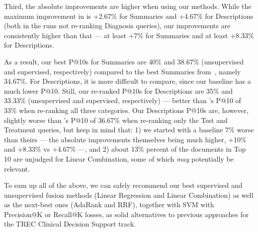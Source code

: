 Third, the absolute improvements are higher when using our methods.
While the maximum improvement
in \cite{choi} is +2.67\% for Summaries and +4.67\% for Descriptions (both in the runs not re-ranking Diagnosis queries),
our improvements are consistently
higher than that --- at least +7\% for Summaries and at least +8.33\% for Descriptions.

As a result, our best P@10s for Summaries are 40\% and 38.67\%
(unsupervised and supervised, respectively) compared to the best Summaries from~\cite{choi}, namely 34.67\%.
For Descriptions, it is more difficult to compare, since our baseline has a much lower P@10.
Still, our re-ranked P@10s for Descriptions are 35\% and 33.33\% (unsupervised and supervised, respectively)
 --- better than \cite{choi}'s P@10 of 33\% when re-ranking all three categories.
Our Descriptions P@10s are, however, slightly worse
than \cite{choi}'s P@10 of 36.67\% when re-ranking only the Test and Treatment queries, but keep in mind that:
1) we started with a baseline 7\% worse than theirs --- the absolute improvements themselves being much higher, +10\% and +8.33\%
vs +4.67\% ---, and 2) about 13\% percent of the documents in Top 10 are unjudged for Linear Combination,
some of which \emph{may} potentially be relevant.

To sum up all of the above, we can safely recommend our best supervised and unsupervised fusion methods
(Linear Regression and Linear Combination) as well as the next-best ones (AdaRank and RRF),
together with SVM with Precision@K or Recall@K losses,
as solid alternatives to previous approaches for the TREC Clinical Decision Support track.


%








